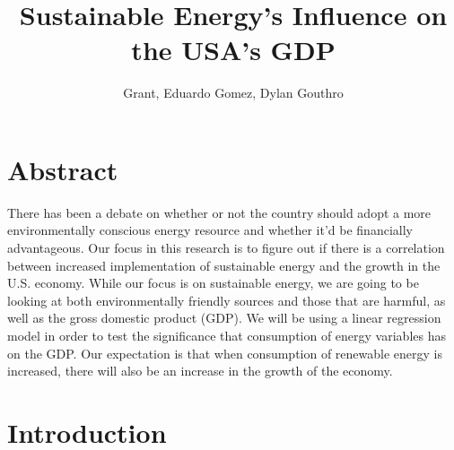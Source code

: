 \documentclass[14pt, titlepage]{article}
\title{Sustainable Energy's Influence on the USA's GDP}
\author{Grant, Eduardo Gomez, Dylan Gouthro}
\begin{document}
\maketitle

	\section*{Abstract}
	
		There has been a debate on whether or not the country should adopt a more environmentally conscious energy resource and whether it’d be financially advantageous. Our focus in this research is to figure out if there is a correlation between increased implementation of sustainable energy and the growth in the U.S. economy. While our focus is on sustainable energy, we are going to be looking at both environmentally friendly sources and those that are harmful, as well as the gross domestic product (GDP). We will be using a linear regression model in order to test the significance that consumption of energy variables has on the GDP.  Our expectation is that when consumption of renewable energy is increased, there will also be an increase in the growth of the economy.
	
	
	\section*{Introduction}
\end{document}
